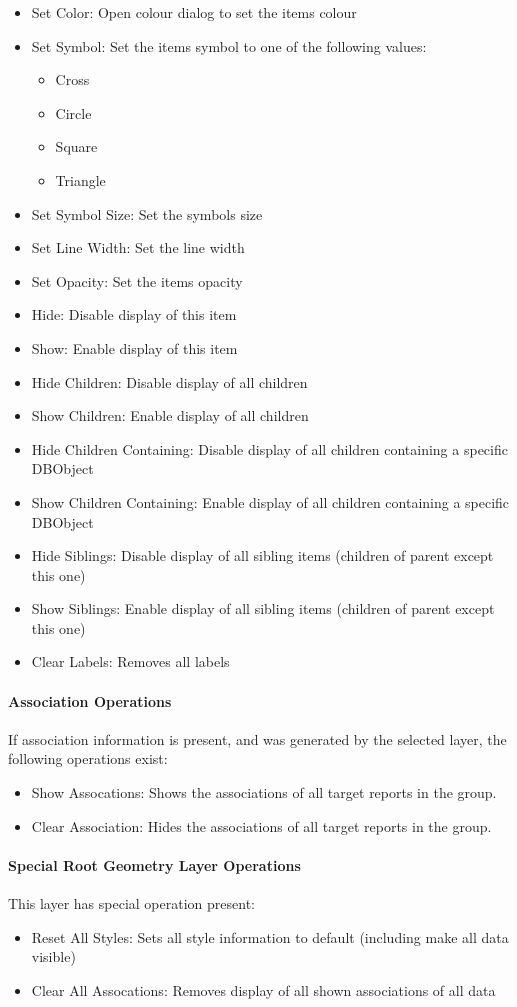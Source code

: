 \begin{itemize}
 \item Set Color: Open colour dialog to set the items colour
 \item Set Symbol: Set the items symbol to one of the following values:
\begin{itemize}
 \item Cross
 \item Circle
 \item Square
 \item Triangle
\end{itemize}
 \item Set Symbol Size: Set the symbols size
 \item Set Line Width: Set the line width
 \item Set Opacity: Set the items opacity
 \item Hide: Disable display of this item
 \item Show: Enable display of this item
 \item Hide Children: Disable display of all children
 \item Show Children: Enable display of all children
 \item Hide Children Containing: Disable display of all children containing a specific DBObject
 \item Show Children Containing: Enable display of all children containing a specific DBObject
 \item Hide Siblings: Disable display of all sibling items (children of parent except this one)
 \item Show Siblings: Enable display of all sibling items (children of parent except this one)
 \item Clear Labels: Removes all labels
\end{itemize}

\paragraph{Association Operations}
If association information is present, and was generated by the selected layer, the following operations exist:

\begin{itemize}
 \item Show Assocations: Shows the associations of all target reports in the group.
 \item Clear Association: Hides the associations of all target reports in the group.
\end{itemize} 


\paragraph{Special Root Geometry Layer Operations}
This layer has special operation present:

\begin{itemize}
 \item Reset All Styles: Sets all style information to default (including make all data visible)
 \item Clear All Assocations: Removes display of all shown associations of all data
\end{itemize} 
